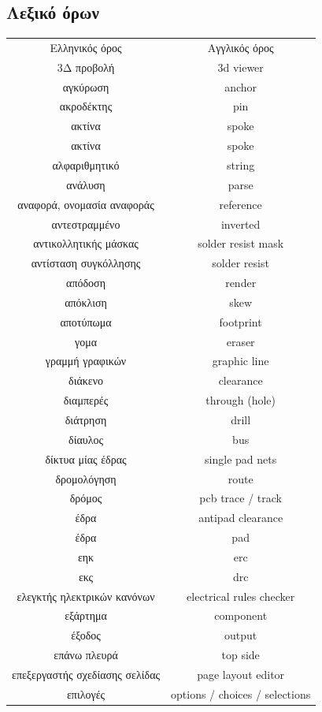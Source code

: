 \documentclass[a4paper]{article}
\begin{document}
\subsection{Λεξικό όρων}
\begin{longtabu}{ c c }
    Ελληνικός όρος	&	Αγγλικός όρος	\\
    3Δ προβολή	&	3d viewer	\\
    αγκύρωση	&	anchor	\\
    ακροδέκτης	&	pin	\\
    ακτίνα	&	spoke	\\
    ακτίνα	&	spoke	\\
    αλφαριθμητικό	&	string	\\
    ανάλυση	&	parse	\\
    αναφορά, ονομασία αναφοράς	&	reference	\\
    αντεστραμμένο	&	inverted	\\
    αντικολλητικής μάσκας	&	solder resist mask	\\
    αντίσταση συγκόλλησης	&	solder resist	\\
    απόδοση	&	render	\\
    απόκλιση	&	skew	\\
    αποτύπωμα	&	footprint	\\
    γομα	&	eraser	\\
    γραμμή γραφικών	&	graphic line	\\
    διάκενο	&	clearance	\\
    διαμπερές	&	through (hole)	\\
    διάτρηση	&	drill	\\
    δίαυλος	&	bus	\\
    δίκτυα μίας έδρας	&	single pad nets	\\
    δρομολόγηση	&	route	\\
    δρόμος	&	pcb trace / track	\\
    έδρα	&	antipad clearance	\\
    έδρα	&	pad	\\
    εηκ	&	erc	\\
    εκς	&	drc	\\
    ελεγκτής ηλεκτρικών κανόνων	&	electrical rules checker	\\
    εξάρτημα	&	component	\\
    έξοδος	&	output	\\
    επάνω πλευρά	&	top side	\\
    επεξεργαστής σχεδίασης σελίδας	&	page layout editor	\\
    επιλογές	&	options / choices / selections	\\

\end{longtabu}
\end{document}
